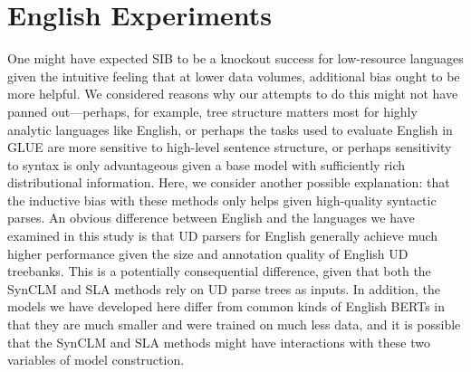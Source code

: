 \documentclass[11pt]{article}
\begin{document}
\section{English Experiments}
One might have expected SIB to be a knockout success for low-resource languages given the intuitive feeling that at lower data volumes, additional bias ought to be more helpful.
We considered reasons why our attempts to do this might not have panned out---perhaps, for example, tree structure matters most for highly analytic languages like English, or perhaps the tasks used to evaluate English in GLUE are more sensitive to high-level sentence structure, or perhaps sensitivity to syntax is only advantageous given a base model with sufficiently rich distributional information.
Here, we consider another possible explanation: that the inductive bias with these methods only helps given high-quality syntactic parses.
An obvious difference between English and the languages we have examined in this study is that UD parsers for English generally achieve much higher performance given the size and annotation quality of English UD treebanks.
This is a potentially consequential difference, given that both the SynCLM and SLA methods rely on UD parse trees as inputs.
In addition, the models we have developed here differ from common kinds of English BERTs in that they are much smaller and were trained on much less data, and it is possible that the SynCLM and SLA methods might have interactions with these two variables of model construction.
\end{document}
